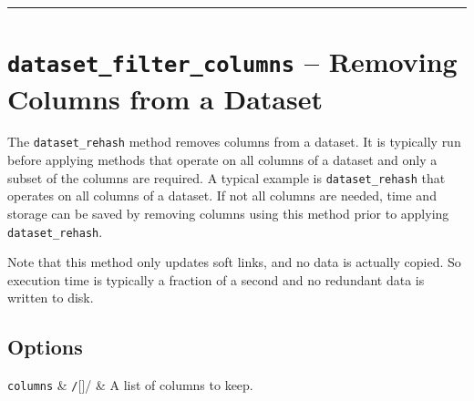 






\par\noindent\rule{\textwidth}{0.4pt}

\section{\texttt{dataset\_filter\_columns} -- Removing Columns from a Dataset}

The \texttt{dataset\_rehash} method removes columns from a dataset.
It is typically run before applying methods that operate on all
columns of a dataset and only a subset of the columns are required.  A
typical example is \texttt{dataset\_rehash} that operates on all
columns of a dataset.  If not all columns are needed, time and storage
can be saved by removing columns using this method prior to applying
\texttt{dataset\_rehash}.

Note that this method only updates soft links, and no data is actually
copied.  So execution time is typically a fraction of a second and no
redundant data is written to disk.

\subsection*{Options}
\starttable
  \RP \texttt{columns} & \texttt/[]/ & A list of columns to
  keep.\\[1ex]
\stoptable






